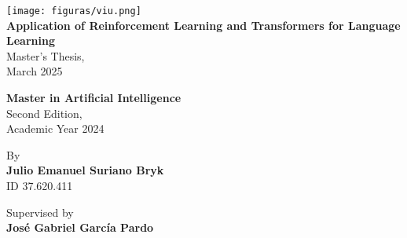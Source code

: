 \begin{titlepage}
  \begin{center}
    \texttt{[image: figuras/viu.png]} \\[1cm]

    \huge \textbf{Application of Reinforcement Learning and Transformers for Language Learning} \\[1cm]

    \large Master's Thesis, \\
    \large March 2025 \\

    \vspace{2cm}

    \Large \textbf{Master in Artificial Intelligence} \\[0.5cm]
    \large Second Edition, \\
    \large Academic Year 2024 \\

    \vspace{2cm}

    \large By \\
    \Large \textbf{Julio Emanuel Suriano Bryk} \\
    \large ID 37.620.411 \\[1cm]

    \vspace{1cm}

    \large Supervised by \\
    \Large \textbf{José Gabriel García Pardo} \\
  \end{center}
\end{titlepage}